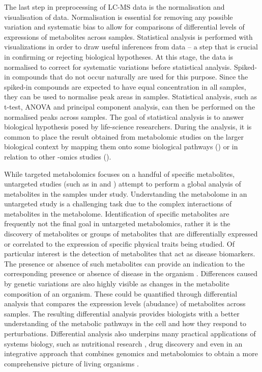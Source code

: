 The last step in preprocessing of LC-MS data is the normalisation and visualisation of data. Normalisation is essential for removing any possible variation and systematic bias to allow for comparisons of differential levels of expressions of metabolites across samples. Statistical analysis is performed with visualizations in order to draw useful inferences from data -- a step that is crucial in confirming or rejecting biological hypotheses. At this stage, the data is normalised to correct for systematic variations before statistical analysis. Spiked-in compounds that do not occur naturally are used for this purpose. Since the spiked-in compounds are expected to have equal concentration in all samples, they can be used to normalise peak areas in samples. Statistical analysis, such as t-test, ANOVA and principal component analysis, can then be performed on the normalised peaks across samples. The goal of statistical analysis is to answer biological hypothesis posed by life-science researchers. During the analysis, it is common to place the result obtained from metabolomic studies on the larger biological context by mapping them onto some biological pathways (\cite{Xia2010,Krumsiek2011a}) or in relation to other -omics studies (\cite{Krumsiek2012,Gieger2008}).

While targeted metabolomics focuses on a handful of specific metabolites, untargeted studies (such as in \cite{DeVos2007a} and \cite{Creek2011}) attempt to perform a global analysis of metabolites in the samples under study. Understanding the metabolome in an untargeted study is a challenging task due to the complex interactions of metabolites in the metabolome. Identification of specific metabolites are frequently not the final goal in untargeted metabolomics, rather it is the discovery of metabolites or groups of metabolites that are differentially expressed or correlated to the expression of specific physical traits being studied. Of particular interest is the detection of metabolites that act as disease biomarkers. The presence or absence of such metabolites can provide an indication to the corresponding presence or absence of disease in the organism \cite{mamas2011role}. Differences caused by genetic variations are also highly visible as changes in the metabolite composition of an organism. These could be quantified through differential analysis that compares the expression levels (abudance) of metabolites across samples. The resulting differential analysis provides biologists with a better understanding of the metabolic pathways in the cell and how they respond to perturbations. Differential analysis also underpins many practical applications of systems biology, such as nutritional research \cite{Gibney2005}, drug discovery \cite{Kell2006} and even in an integrative approach that combines genomics and metabolomics to obtain a more comprehensive picture of living organisms \cite{Gieger2008}. 

